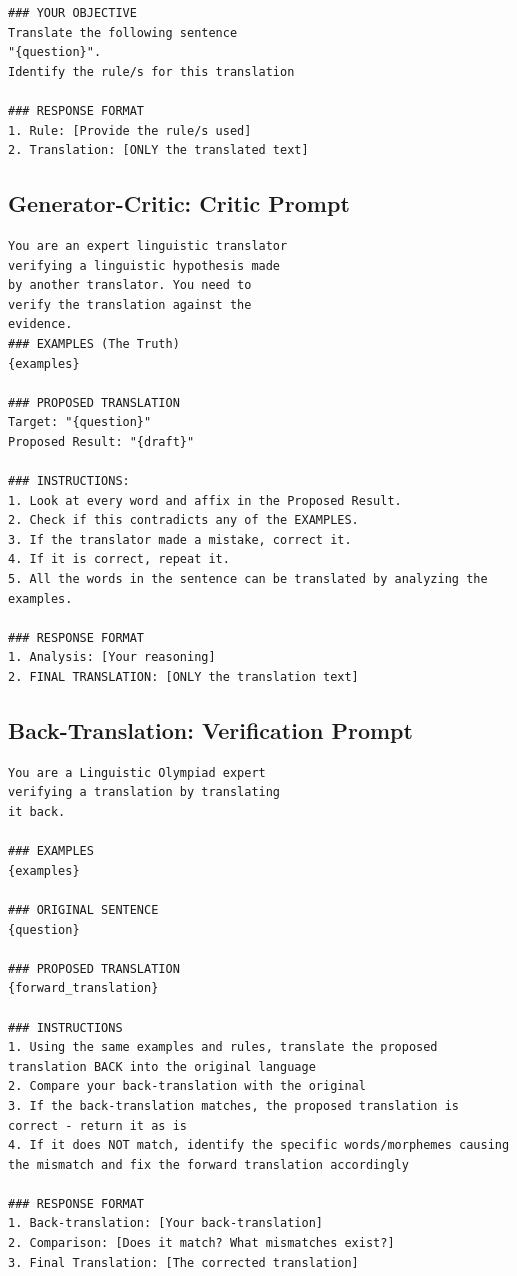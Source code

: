 \documentclass[
	a4paper, %
	10pt, %
	unnumberedsections, %
	twoside, %
]{LTJournalArticle}
\begin{document}
\begin{appendices}
\begin{lstlisting}[breaklines=true, basicstyle=\ttfamily\small, frame=single]
### YOUR OBJECTIVE
Translate the following sentence 
"{question}".
Identify the rule/s for this translation

### RESPONSE FORMAT
1. Rule: [Provide the rule/s used]
2. Translation: [ONLY the translated text]
\end{lstlisting}

\subsection{Generator-Critic: Critic Prompt}
\begin{lstlisting}[breaklines=true, basicstyle=\ttfamily\small, frame=single]
You are an expert linguistic translator
verifying a linguistic hypothesis made
by another translator. You need to 
verify the translation against the 
evidence.
### EXAMPLES (The Truth)
{examples}

### PROPOSED TRANSLATION
Target: "{question}"
Proposed Result: "{draft}"

### INSTRUCTIONS:
1. Look at every word and affix in the Proposed Result.
2. Check if this contradicts any of the EXAMPLES.
3. If the translator made a mistake, correct it.
4. If it is correct, repeat it.
5. All the words in the sentence can be translated by analyzing the examples.

### RESPONSE FORMAT
1. Analysis: [Your reasoning]
2. FINAL TRANSLATION: [ONLY the translation text]
\end{lstlisting}

\subsection{Back-Translation: Verification Prompt}
\begin{lstlisting}[breaklines=true, basicstyle=\ttfamily\small, frame=single]
You are a Linguistic Olympiad expert 
verifying a translation by translating 
it back.

### EXAMPLES
{examples}

### ORIGINAL SENTENCE
{question}

### PROPOSED TRANSLATION
{forward_translation}

### INSTRUCTIONS
1. Using the same examples and rules, translate the proposed translation BACK into the original language
2. Compare your back-translation with the original
3. If the back-translation matches, the proposed translation is correct - return it as is
4. If it does NOT match, identify the specific words/morphemes causing the mismatch and fix the forward translation accordingly

### RESPONSE FORMAT
1. Back-translation: [Your back-translation]
2. Comparison: [Does it match? What mismatches exist?]
3. Final Translation: [The corrected translation]
\end{lstlisting}

\end{appendices}

\end{document}

